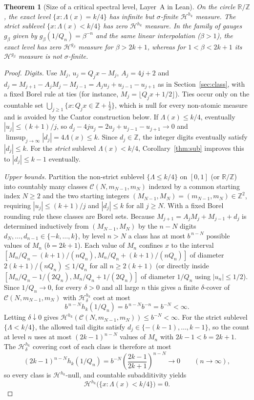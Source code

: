 \documentclass[11pt]{article}
\newtheorem{theorem}{Theorem}
\theoremstyle{definition}
\theoremstyle{remark}
\newcommand{\R}{\mathbb{R}}
\newcommand{\Z}{\mathbb{Z}}
\newcommand{\Lam}{\Lambda}
\begin{document}
\begin{theorem}[Size of a critical spectral level, Layer~A in Lean]\label{thm:gauge}
On the circle $\R/\Z$, the exact level $\{x:\Lam(x)=k/4\}$ has
infinite but $\sigma$-finite $\mathcal H^{h_k}$ measure.
The strict sublevel $\{x:\Lam(x)<k/4\}$ has zero $\mathcal H^{h_k}$ measure.
In the family of gauges $g_\beta$ given by $g_\beta(1/Q_n)=\beta^{-n}$
and the same linear interpolation ($\beta>1$), the exact level has zero
$\mathcal H^{g_\beta}$ measure for $\beta>2k+1$, whereas for $1<\beta<2k+1$ its
$\mathcal H^{g_\beta}$ measure is not $\sigma$-finite.
\end{theorem}

\begin{proof}
\emph{Digits.} Use $M_j$, $u_j=Q_jx-M_j$, $A_j=4j+2$ and
$d_j=M_{j+1}-A_jM_j-M_{j-1}=A_ju_j+u_{j-1}-u_{j+1}$ as in
Section~\ref{sec:class}, with a fixed Borel rule at ties (for instance,
$M_j=\lfloor Q_jx+1/2\rfloor$). Ties occur only on the
countable set $\bigcup_{j\ge1}\{x:Q_jx\in\Z+\tfrac12\}$, which is null for every
non-atomic measure and is avoided by the Cantor construction below.
If $\Lam(x)\le k/4$, eventually $|u_j|\le(k+1)/j$, so
$d_j-4ju_j=2u_j+u_{j-1}-u_{j+1}\to0$ and
$\limsup_{j\to\infty}|d_j|=4\Lam(x)\le k$. Since $d_j\in\Z$, the integer digits
eventually satisfy $|d_j|\le k$. For the \emph{strict} sublevel $\Lam(x)<k/4$,
Corollary~\ref{thm:sub} improves this to $|d_j|\le k-1$ eventually.

\emph{Upper bounds.} Partition the non-strict sublevel $\{\Lam\le k/4\}$ on
$[0,1]$ (or $\R/\Z$) into countably many classes
$\mathcal C(N,m_{N-1},m_N)$ indexed by a common starting index $N\ge2$ and the
two starting integers $(M_{N-1},M_N)=(m_{N-1},m_N)\in\Z^2$, requiring
$|u_j|\le(k+1)/j$ and $|d_j|\le k$ for all $j\ge N$. With a fixed Borel rounding
rule these classes are Borel sets. Because $M_{j+1}=A_jM_j+M_{j-1}+d_j$ is
determined inductively from $(M_{N-1},M_N)$ by the $n-N$ digits
$d_N,\dots,d_{n-1}\in\{-k,\dots,k\}$, by level $n>N$ a class has at most
$b^{\,n-N}$ possible values of $M_n$ ($b=2k+1$). Each value of $M_n$ confines
$x$ to the interval $[M_n/Q_n-(k+1)/(nQ_n),M_n/Q_n+(k+1)/(nQ_n)]$ of diameter
$2(k+1)/(nQ_n)\le1/Q_n$ for all $n\ge2(k+1)$ (or directly inside
$[M_n/Q_n-1/(2Q_n),M_n/Q_n+1/(2Q_n)]$ of diameter $1/Q_n$ using $|u_n|\le1/2$).
Since $1/Q_n\to0$, for every $\delta>0$ and all large $n$ this gives a finite
$\delta$-cover of $\mathcal C(N,m_{N-1},m_N)$ with $\mathcal H_\delta^{h_k}$
cost at most
\[
b^{\,n-N}h_k(1/Q_n)=b^{\,n-N}b^{-n}=b^{-N}<\infty.
\]
Letting $\delta\downarrow0$ gives
$\mathcal H^{h_k}(\mathcal C(N,m_{N-1},m_N))\le b^{-N}<\infty$. For the strict
sublevel $\{\Lam<k/4\}$, the allowed tail digits satisfy
$d_j\in\{-(k-1),\dots,k-1\}$, so the count at level $n$ uses at most
$(2k-1)^{n-N}$ values of $M_n$ with $2k-1<b=2k+1$. The $\mathcal H_\delta^{h_k}$
covering cost of each class is therefore at most
\[
(2k-1)^{n-N}h_k(1/Q_n)=b^{-N}\left(\frac{2k-1}{2k+1}\right)^{n-N}\longrightarrow0
\qquad(n\to\infty),
\]
so every class is $\mathcal H^{h_k}$-null, and countable subadditivity yields
\begin{equation}\label{eq:strict-null}
 \mathcal H^{h_k}\bigl(\{x:\Lam(x)<k/4\}\bigr)=0 .
\end{equation}


\end{proof}
\end{document}
